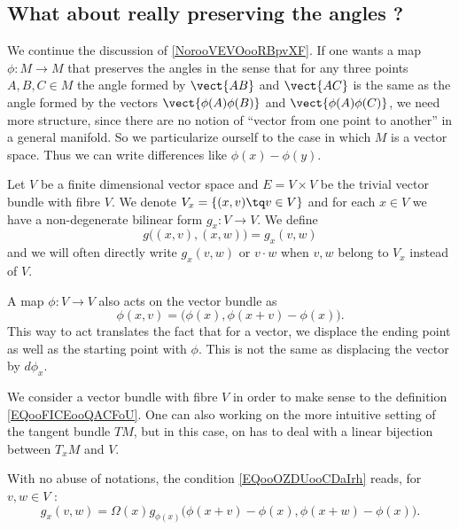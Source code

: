 \subsection{What about really preserving the angles ?}
\label{sebsecooCBKEooQOWqFo}

We continue the discussion of \ref{NorooVEVOooRBpvXF}. If one wants a map \( \phi\colon M\to M\) that preserves the angles in the sense that for any three points \( A,B,C\in M\) the angle formed by \( \vect{ AB }\) and \( \vect{ AC }\) is the same as the angle formed by the vectors \( \vect{ \phi(A)\phi(B) }\) and \( \vect{ \phi(A)\phi(C) }\), we need more structure, since there are no notion of ``vector from one point to another'' in a general manifold. So we particularize ourself to the case in which \( M\) is a vector space. Thus we can write differences like \( \phi(x)-\phi(y)\).

Let \( V\) be a finite dimensional vector space and \( E=V\times V\) be the trivial vector bundle with fibre \( V\). We denote \( V_x=\{ (x,v)\tq v\in V \}\) and for each \( x\in V\) we have a non-degenerate bilinear form \( g_x\colon V\to V\). We define
\begin{equation}
    g\big( (x,v),(x,w) \big)=g_x(v,w)
\end{equation}
and we will often directly write \( g_x(v,w)\) or \( v\cdot w\) when \( v,w\) belong to \(V_x\) instead of \( V\).

A map \( \phi\colon V\to V\) also acts on the vector bundle as
\begin{equation}        \label{EQooFICEooQACFoU}
    \phi(x,v)=\big( \phi(x),\phi(x+v)-\phi(x) \big).
\end{equation}
This way to act translates the fact that for a vector, we displace the ending point as well as the starting point with \( \phi\). This is not the same as displacing the vector by \( d\phi_x\).

\begin{remark}
    We consider a vector bundle with fibre \( V\) in order to make sense to the definition \eqref{EQooFICEooQACFoU}. One can also working on the more intuitive setting of the tangent bundle \( TM\), but in this case, on has to deal with a linear bijection between \( T_xM\) and \( V\).
\end{remark}

With no abuse of notations, the condition \eqref{EQooOZDUooCDaIrh} reads, for \( v,w\in V\) :
\begin{equation}\label{EQooFZUFooTGWpBn}
    g_x(v,w)=\Omega(x)g_{\phi(x)}\big(  \phi(x+v)-\phi(x),\phi(x+w)-\phi(x)  \big).
\end{equation}



